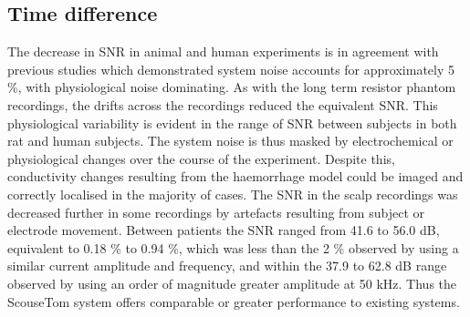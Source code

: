 \subsection{Time difference}
The decrease in SNR in animal and human experiments is in agreement with previous studies \cite{fabrizi2007analysis} which demonstrated system noise accounts for approximately 5 \%, with physiological noise dominating. As with the long term resistor phantom recordings, the drifts across the recordings reduced the equivalent SNR. This physiological variability is evident in the range of SNR between subjects in both rat and human subjects. The system noise is thus masked by electrochemical or physiological changes over the course of the experiment. Despite this, conductivity changes resulting from the haemorrhage model could be imaged and correctly localised in the majority of cases. The SNR in the scalp recordings was decreased further in some recordings by artefacts resulting from subject or electrode movement. Between patients the SNR ranged from 41.6 to 56.0 dB, equivalent to 0.18 \% to 0.94 \%, which was less than the 2 \% observed by \citet{Romsauerova2006} using a similar current amplitude and frequency, and within the 37.9 to 62.8 dB range observed by \citet{xu2011} using an order of magnitude greater amplitude at 50 kHz. Thus the ScouseTom system offers comparable or greater performance to existing systems.